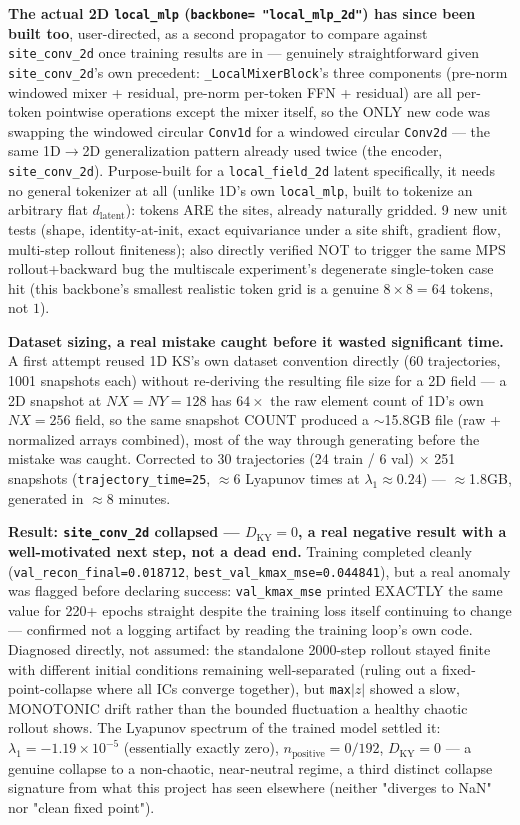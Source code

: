\documentclass[11pt]{article}
\begin{document}
\textbf{The actual 2D \texttt{local\_mlp} (\texttt{backbone=
"local\_mlp\_2d"}) has since been built too}, user-directed, as a
second propagator to compare against \texttt{site\_conv\_2d} once
training results are in --- genuinely straightforward given
\texttt{site\_conv\_2d}'s own precedent:
\texttt{\_LocalMixerBlock}'s three components (pre-norm windowed mixer + residual, pre-norm per-token
FFN + residual) are all per-token pointwise operations except the
mixer itself, so the ONLY new code was swapping the windowed circular
\texttt{Conv1d} for a windowed circular \texttt{Conv2d} --- the same
1D$\to$2D generalization pattern already used twice (the encoder,
\texttt{site\_conv\_2d}). Purpose-built for a \texttt{local\_field\_2d}
latent specifically, it needs no general tokenizer at all (unlike 1D's
own \texttt{local\_mlp}, built to tokenize an arbitrary flat
$d_{\mathrm{latent}}$): tokens ARE the sites, already naturally
gridded. 9 new unit tests (shape, identity-at-init, exact equivariance
under a site shift, gradient flow, multi-step rollout finiteness);
also directly verified NOT to trigger the same MPS rollout+backward
bug the multiscale experiment's degenerate single-token case hit
(this backbone's smallest realistic token grid is a genuine
$8\times8{=}64$ tokens, not $1$).

\textbf{Dataset sizing, a real mistake caught before it wasted
significant time.} A first attempt reused 1D KS's own dataset
convention directly (60 trajectories, 1001 snapshots each) without
re-deriving the resulting file size for a 2D field --- a 2D snapshot at
$NX{=}NY{=}128$ has $64\times$ the raw element count of 1D's own
$NX{=}256$ field, so the same snapshot COUNT produced a $\sim$15.8GB
file (raw + normalized arrays combined), most of the way through
generating before the mistake was caught. Corrected to 30 trajectories
(24 train / 6 val) $\times$ 251 snapshots (\texttt{trajectory\_time=25},
$\approx$6 Lyapunov times at $\lambda_1{\approx}0.24$) --- $\approx$1.8GB,
generated in $\approx$8 minutes.

\textbf{Result: \texttt{site\_conv\_2d} collapsed --- $D_{\mathrm{KY}}=0$,
a real negative result with a well-motivated next step, not a dead
end.} Training completed cleanly (\texttt{val\_recon\_final=0.018712},
\texttt{best\_val\_kmax\_mse=0.044841}), but a real anomaly was flagged before
declaring success: \texttt{val\_kmax\_mse} printed EXACTLY the same
value for 220+ epochs straight despite the training loss itself
continuing to change --- confirmed not a logging artifact by reading
the training loop's own code. Diagnosed directly, not assumed: the
standalone 2000-step rollout stayed finite with different initial
conditions remaining well-separated (ruling out a fixed-point-collapse
where all ICs converge together), but \texttt{max}$|z|$ showed a slow,
MONOTONIC drift rather than the bounded fluctuation a healthy chaotic
rollout shows. The Lyapunov spectrum of the trained model settled it:
$\lambda_1=-1.19\times10^{-5}$ (essentially exactly zero),
$n_{\mathrm{positive}}=0/192$, $D_{\mathrm{KY}}=0$ --- a genuine
collapse to a non-chaotic, near-neutral regime, a third distinct
collapse signature from what this project has seen elsewhere (neither
"diverges to NaN" nor "clean fixed point").
\end{document}
